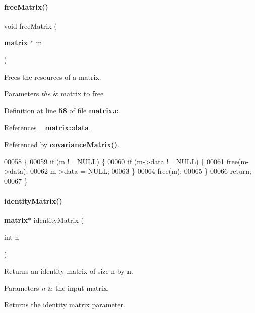 \paragraph{free\+Matrix()}
{\footnotesize\ttfamily void free\+Matrix (\begin{DoxyParamCaption}\item[{\textbf{ matrix} $\ast$}]{m }\end{DoxyParamCaption})}



Frees the resources of a matrix. 


\begin{DoxyParams}{Parameters}
{\em the} & matrix to free \\
\hline
\end{DoxyParams}


Definition at line \textbf{ 58} of file \textbf{ matrix.\+c}.



References \textbf{ \+\_\+matrix\+::data}.



Referenced by \textbf{ covariance\+Matrix()}.


\begin{DoxyCode}
00058                            \{
00059   \textcolor{keywordflow}{if} (m != NULL) \{
00060     \textcolor{keywordflow}{if} (m->data != NULL) \{
00061       free(m->data);
00062       m->data = NULL;
00063     \}
00064     free(m);
00065   \}
00066   \textcolor{keywordflow}{return};
00067 \}
\end{DoxyCode}
\mbox{\label{a00125_aa3f5e409b1641373be7cf7284e216d1a}} 
\paragraph{identity\+Matrix()}
{\footnotesize\ttfamily \textbf{ matrix}$\ast$ identity\+Matrix (\begin{DoxyParamCaption}\item[{int}]{n }\end{DoxyParamCaption})}



Returns an identity matrix of size n by n. 


\begin{DoxyParams}{Parameters}
{\em n} & the input matrix. \\
\hline
\end{DoxyParams}
\begin{DoxyReturn}{Returns}
the identity matrix parameter. 
\end{DoxyReturn}



